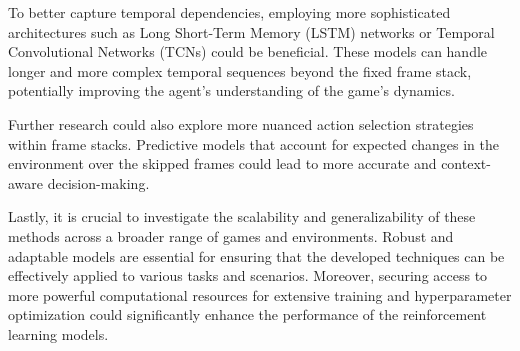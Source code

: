 \documentclass[twocolumn]{webofc}
\begin{document}
To better capture temporal dependencies, employing more sophisticated architectures such as Long Short-Term Memory (LSTM) networks or Temporal Convolutional Networks (TCNs) could be beneficial. These models can handle longer and more complex temporal sequences beyond the fixed frame stack, potentially improving the agent's understanding of the game's dynamics.

Further research could also explore more nuanced action selection strategies within frame stacks. Predictive models that account for expected changes in the environment over the skipped frames could lead to more accurate and context-aware decision-making.

Lastly, it is crucial to investigate the scalability and generalizability of these methods across a broader range of games and environments. Robust and adaptable models are essential for ensuring that the developed techniques can be effectively applied to various tasks and scenarios. Moreover, securing access to more powerful computational resources for extensive training and hyperparameter optimization could significantly enhance the performance of the reinforcement learning models.




\end{document}
